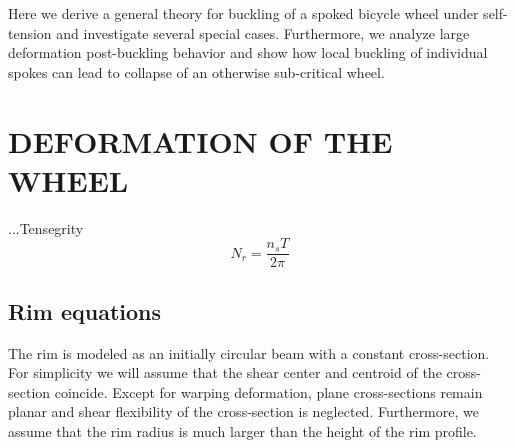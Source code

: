 \documentclass{bmd2016p}
\begin{document}
Here we derive a general theory for buckling of a spoked bicycle wheel under self-tension and investigate several special cases. Furthermore, we analyze large deformation post-buckling behavior and show how local buckling of individual spokes can lead to collapse of an otherwise sub-critical wheel.




\section{DEFORMATION OF THE WHEEL}
...Tensegrity
	\begin{equation}\label{eq:TN}
	N_r = \frac{n_sT}{2\pi}
	\end{equation}



\subsection{Rim equations}

The rim is modeled as an initially circular beam with a constant cross-section. For simplicity we will assume that the shear center and centroid of the cross-section coincide. Except for warping deformation, plane cross-sections remain planar and shear flexibility of the cross-section is neglected. Furthermore, we assume that the rim radius is much larger than the height of the rim profile.
\end{document}
